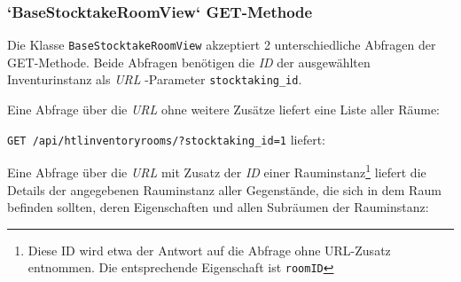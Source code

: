 \subsubsection*{`BaseStocktakeRoomView` GET-Methode}

Die Klasse \texttt{BaseStocktakeRoomView} akzeptiert 2 unterschiedliche
Abfragen der GET-Methode. Beide Abfragen benötigen die \emph{ID}
der ausgewählten Inventurinstanz als \emph{URL}
-Parameter
\texttt{stocktaking\_id}.

Eine Abfrage über die \emph{URL}
 ohne weitere Zusätze
liefert eine Liste aller Räume:

\texttt{GET\ /api/htlinventoryrooms/?stocktaking\_id=1} liefert:

\begin{Shaded}
\begin{Highlighting}[]
\FunctionTok{\{}
    \FunctionTok{:} \OtherTok{[}\FunctionTok{\{}
            \FunctionTok{:} \FunctionTok{,}
            \FunctionTok{:} \FunctionTok{,}
            \FunctionTok{:} \FunctionTok{,}
            \FunctionTok{:} \FunctionTok{,}
            \FunctionTok{:} 
        \FunctionTok{\}}\OtherTok{,} \FunctionTok{\{}
            \FunctionTok{:} \FunctionTok{,}
            \FunctionTok{:} \FunctionTok{,}
            \FunctionTok{:} \FunctionTok{,}
            \FunctionTok{:} \FunctionTok{,}
            \FunctionTok{:} 
        \FunctionTok{\}}\OtherTok{,}
    \OtherTok{]}
\FunctionTok{\}}
\end{Highlighting}
\end{Shaded}

Eine Abfrage über die \emph{URL}
 mit Zusatz der \emph{ID}
einer Rauminstanz\footnote{Diese ID wird etwa der Antwort auf die
  Abfrage ohne URL-Zusatz entnommen. Die entsprechende Eigenschaft ist
  \texttt{roomID}} liefert die Details der angegebenen Rauminstanz
\inkl{} aller Gegenstände, die sich in dem Raum befinden sollten, deren
Eigenschaften und allen Subräumen der Rauminstanz:

